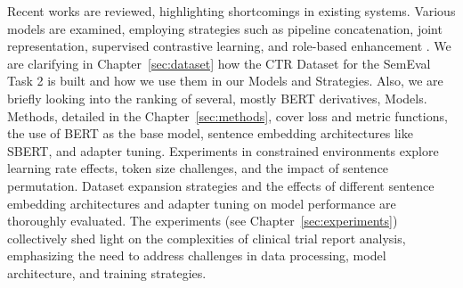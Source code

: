 Recent works are reviewed, highlighting shortcomings in existing systems. 
Various models are examined, employing strategies such as pipeline concatenation, 
joint representation, supervised contrastive learning, and role-based enhancement \cite{wang_knowcomp_2023}\cite{alissa_just-km_2023}\cite{vladika_sebis_2023}\cite{zhou_thifly_2023}.
We are clarifying in Chapter~\ref{sec:dataset} how the CTR Dataset for the SemEval Task 2
is built and how we use them in our Models and Strategies. Also, we are briefly looking into the 
ranking of several, mostly BERT derivatives, Models.
Methods, detailed in the Chapter~\ref{sec:methods}, cover loss and metric functions, 
the use of BERT as the base model, sentence embedding architectures 
like SBERT, and adapter tuning. Experiments in constrained environments 
explore learning rate effects, token size challenges, and the impact of sentence 
permutation. Dataset expansion strategies and the effects of different sentence 
embedding architectures and adapter tuning on model performance are thoroughly evaluated.
The experiments (see Chapter~\ref{sec:experiments}) collectively shed light on the complexities of clinical trial report analysis, 
emphasizing the need to address challenges in data processing, model architecture, and training 
strategies.







